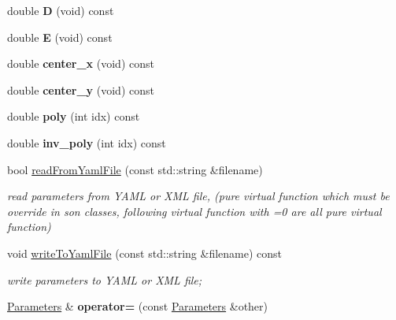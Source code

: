 \begin{DoxyCompactItemize}
double {\bfseries D} (void) const
\item 
\mbox{\label{classcamodocal_1_1OCAMCamera_1_1Parameters_aefcc313d9f8ad86d85246f51572f4712}} 
double {\bfseries E} (void) const
\item 
\mbox{\label{classcamodocal_1_1OCAMCamera_1_1Parameters_a7e74ed9d7bc976fa74901ce026062cc4}} 
double {\bfseries center\+\_\+x} (void) const
\item 
\mbox{\label{classcamodocal_1_1OCAMCamera_1_1Parameters_af23f81c7d79e8b210b46254775f436d2}} 
double {\bfseries center\+\_\+y} (void) const
\item 
\mbox{\label{classcamodocal_1_1OCAMCamera_1_1Parameters_a6c61dd647ad90a4cf3702e5767980425}} 
double {\bfseries poly} (int idx) const
\item 
\mbox{\label{classcamodocal_1_1OCAMCamera_1_1Parameters_a0952003a1e3a9ed457e2f87224239139}} 
double {\bfseries inv\+\_\+poly} (int idx) const
\item 
bool \hyperlink{classcamodocal_1_1OCAMCamera_1_1Parameters_a4cf20a66d7f4e9daf84fec3a83a6c458}{read\+From\+Yaml\+File} (const std\+::string \&filename)
\begin{DoxyCompactList}\small\item\em read parameters from Y\+A\+ML or X\+ML file, (pure virtual function which must be override in son classes, following virtual function with \textquotesingle{}=0\textquotesingle{} are all pure virtual function) \end{DoxyCompactList}\item 
void \hyperlink{classcamodocal_1_1OCAMCamera_1_1Parameters_a3244c89711d0195540042c3700992827}{write\+To\+Yaml\+File} (const std\+::string \&filename) const
\begin{DoxyCompactList}\small\item\em write parameters to Y\+A\+ML or X\+ML file; \end{DoxyCompactList}\item 
\mbox{\label{classcamodocal_1_1OCAMCamera_1_1Parameters_ac17af0a8e2efbc0048aa0cc97acb6fd9}} 
\hyperlink{classcamodocal_1_1OCAMCamera_1_1Parameters}{Parameters} \& {\bfseries operator=} (const \hyperlink{classcamodocal_1_1OCAMCamera_1_1Parameters}{Parameters} \&other)
\end{DoxyCompactItemize}
